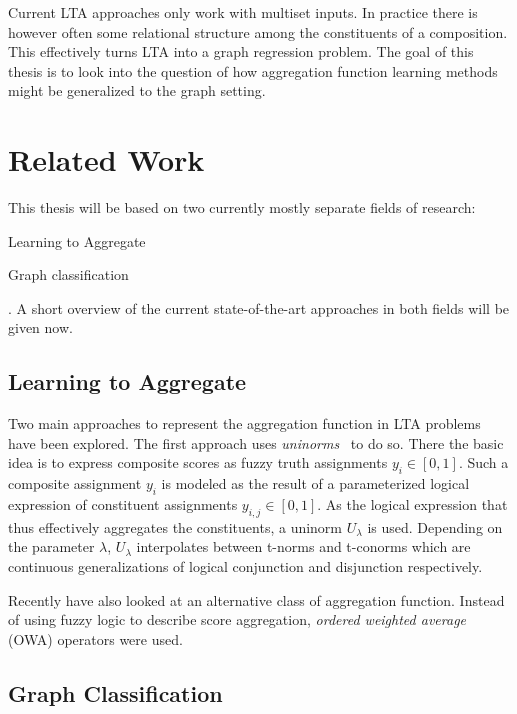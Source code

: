 \documentclass[12pt]{scrartcl}
\begin{document}
Current LTA approaches only work with multiset inputs.
In practice there is however often some relational structure among the constituents of a composition.
This effectively turns LTA into a graph regression problem.
The goal of this thesis is to look into the question of how aggregation function learning methods might be generalized to the graph setting.

\section{Related Work}%
\label{sec:related-work}

This thesis will be based on two currently mostly separate fields of research:
\begin{enumerate*}[label=\textbf{\arabic*.}]
	\item Learning to Aggregate
	\item Graph classification
\end{enumerate*}.
A short overview of the current state-of-the-art approaches in both fields will be given now.

\subsection{Learning to Aggregate}%
\label{sec:related-work:lta}

Two main approaches to represent the aggregation function in LTA problems have been explored.
The first approach uses \textit{uninorms}~\cite{Melnikov2016} to do so.
There the basic idea is to express composite scores as fuzzy truth assignments $y_i \in [0, 1]$.
Such a composite assignment $y_i$ is modeled as the result of a parameterized logical expression of constituent assignments $y_{i,j} \in [0, 1]$.
As the logical expression that thus effectively aggregates the constituents, a uninorm $U_{\lambda}$ is used.
Depending on the parameter $\lambda$, $U_{\lambda}$ interpolates between t-norms and t-conorms which are continuous generalizations of logical conjunction and disjunction respectively.

Recently \citet{Melnikov2019} have also looked at an alternative class of aggregation function.
Instead of using fuzzy logic to describe score aggregation, \textit{ordered weighted average} (OWA) operators were used.

\subsection{Graph Classification}%
\label{sec:related-work:gc}
\end{document}
